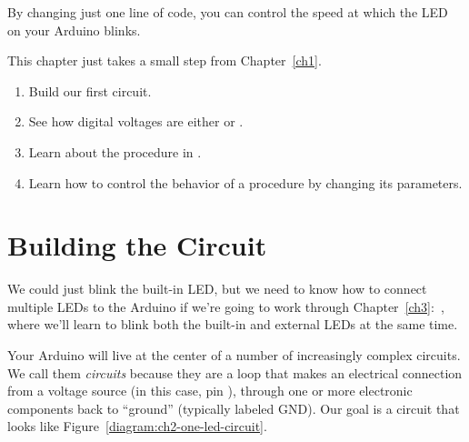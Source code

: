 \newcommand{\chtwopin}{{\constant 13}\xspace}

By changing just one line of code, you can control the speed at which the LED on your Arduino blinks.

\GOALS
This chapter just takes a small step from Chapter~\ref{ch1}.
\begin{enumerate}
	\item Build our first circuit.
	\item See how digital voltages are either \HIGH or \LOW.
	\item Learn about the \blink procedure in \plumbing.
	\item Learn how to control the behavior of a procedure by changing its parameters.	

\end{enumerate}


\section{Building the Circuit}
We could just blink the built-in LED, but we need to know how to connect multiple LEDs to the Arduino if we're going to work through Chapter~\ref{ch3}:~, where we'll learn to blink both the built-in and external LEDs at the same time.


Your Arduino will live at the center of a number of increasingly complex circuits. We call them {\em circuits} because they are a loop that makes an electrical connection from a voltage source (in this case, pin \chtwopin), through one or more electronic components back to ``ground'' (typically labeled {\code GND}). Our goal is a circuit that looks like Figure~\vref{diagram:ch2-one-led-circuit}.

